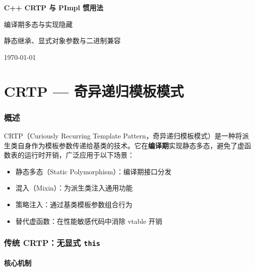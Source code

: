 \documentclass[12pt,a4paper,fontset=fandol]{ctexbook}
\begin{document}
\frontmatter

\begin{titlepage}
\centering
\vspace*{4cm}
{\Huge\bfseries C++ CRTP 与 PImpl 惯用法\par}
\vspace{1cm}
{\LARGE 编译期多态与实现隐藏\par}
\vspace{0.4cm}
{\Large 静态继承、显式对象参数与二进制兼容\par}
\vfill
{\large \today\par}
\end{titlepage}

\tableofcontents

\mainmatter

\cleardoublepage

\part{CRTP — 奇异递归模板模式}

\section{概述}

CRTP（Curiously Recurring Template Pattern，奇异递归模板模式）是一种将派生类自身作为模板参数传递给基类的技术。它在\textbf{编译期}实现静态多态，避免了虚函数表的运行时开销，广泛应用于以下场景：

\begin{itemize}[leftmargin=2em]
  \item 静态多态（Static Polymorphism）：编译期接口分发
  \item 混入（Mixin）：为派生类注入通用功能
  \item 策略注入：通过基类模板参数组合行为
  \item 替代虚函数：在性能敏感代码中消除 vtable 开销
\end{itemize}

\section{传统 CRTP：无显式 \texttt{this}}

\subsection{核心机制}
\end{document}
